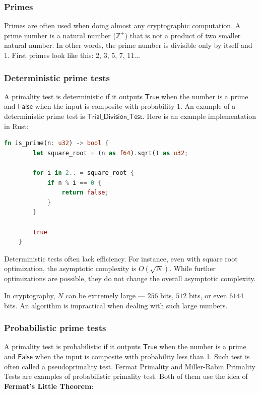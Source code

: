 \documentclass[../lecture-notes.tex]{subfiles}
\begin{document}
\subsubsection{Primes}

Primes are often used when doing almost any cryptographic computation. A prime number is a natural number ($\mathbb{Z}^{+}$) that is not a product
of two smaller natural number. In other words, the prime number is divisible only by itself and 1. First primes look like this: 2, 3, 5, 7, 11...

\subsubsection{Deterministic prime tests}

A primality test is deterministic if it outputs $\mathsf{True}$ when the number is a prime and $\mathsf{False}$ when the input is composite with probability 1.
An example of a deterministic prime test is $\mathsf{Trial\_Division\_Test}$. Here is an example implementation in Rust: 

\begin{lstlisting}[language=Rust]
    fn is_prime(n: u32) -> bool {
        let square_root = (n as f64).sqrt() as u32;

        for i in 2.. = square_root {
            if n % i == 0 {
                return false;
            }
        }

        true
    }
\end{lstlisting}

Deterministic tests often lack efficiency. For instance, even with square root optimization, the asymptotic complexity is $O(\sqrt{N})$. 
While further optimizations are possible, they do not change the overall asymptotic complexity.

In cryptography, $N$ can be extremely large — $256$ bits, $512$ bits, or even $6144$ bits. 
An algorithm is impractical when dealing with such large numbers.

\subsubsection{Probabilistic prime tests}

A primality test is probabilistic if it outputs $\mathsf{True}$ when the number is a prime and $\mathsf{False}$ when the input is composite with probability less than 1. Such test is often called a pseudoprimality test.
Fermat Primality and Miller-Rabin Primality Tests are examples of probabilistic primality test. Both of them use the idea of \textbf{Fermat's Little Theorem}:
\end{document}
